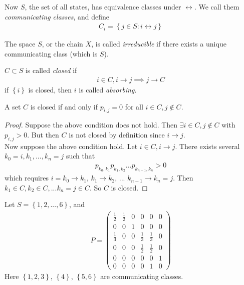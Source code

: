 \documentclass[a4paper]{article}
\begin{document}
\begin{defi}
Now $S$, the set of all states, has equivalence classes under $\leftrightarrow$. We call them \emph{communicating classes}, and define
\begin{equation*}
\begin{aligned}
C_i = \left\{ j \in S: i \leftrightarrow j\right\}
\end{aligned}
\end{equation*}

The space $S$, or the chain $X$, is called \emph{irreducible} if there exists a unique communicating class (which is $S$).

$C \subset S$ is called \emph{closed} if
\begin{equation*}
\begin{aligned}
i\in C, i\to j \implies j \to C
\end{aligned}
\end{equation*}
if $\left\{i\right\}$ is closed, then $i$ is called \emph{absorbing}.
\end{defi}

\begin{prop}
A set $C$ is closed if and only if $p_{i,j} = 0$ for all $i \in C, j \not\in C$.
\begin{proof}
Suppose the above condition does not hold. Then $\exists i \in C, j \not\in C$ with $p_{i,j} > 0$. But then $C$ is not closed by definition since $i \to j$.\\
Now suppose the above condition hold. Let $i \in C,i \to j$. There exists several $k_0 = i, k_1,...,k_n = j$ such that
\begin{equation*}
\begin{aligned}
p_{k_0,k_1} p_{k_1,k_2}...p_{k_{n-1},k_n} > 0
\end{aligned}
\end{equation*}
which requires $i=k_0 \to k_1$, $k_1 \to k_2$, ... $k_{n-1} \to k_n=j$. Then $k_1 \in C, k_2 \in C,... k_n = j\in C$. So $C$ is closed.
\end{proof}
\end{prop}

\begin{eg}
Let $S = \left\{1,2,...,6\right\}$, and
\begin{equation*}
\begin{aligned}
P = \left(
\begin{matrix}
\frac{1}{2} & \frac{1}{2} & 0 & 0 & 0 & 0\\
0 & 0 & 1 & 0 & 0 & 0\\
\frac{1}{3} & 0 & 0 & \frac{1}{3} & \frac{1}{3} & 0\\
0 & 0 & 0 & \frac{1}{2} & \frac{1}{2} & 0\\
0 & 0 & 0 & 0 & 0 & 1\\
0 & 0 & 0 & 0 & 1 & 0
\end{matrix}
\right)
\end{aligned}
\end{equation*}
Here $\left\{1,2,3\right\}$, $\left\{4\right\}$, $\left\{5,6\right\}$ are communicating classes.
\end{eg}
\end{document}
